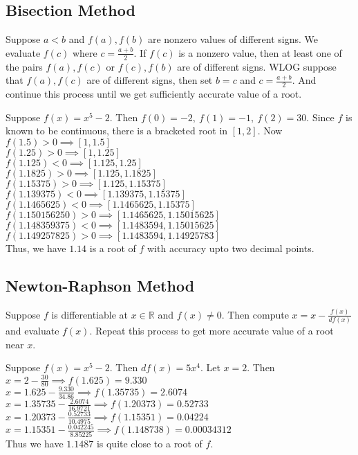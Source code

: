 \subsection{Bisection Method}
	Suppose $a < b$ and $f(a),f(b)$ are nonzero values of different signs. We evaluate $f(c)$ where $c = \frac{a+b}{2}$. If $f(c)$ is a nonzero value, then at least one of the pairs $f(a),f(c)$ or $f(c),f(b)$ are of different signs. WLOG suppose that $f(a),f(c)$ are of different signs, then set $b = c$ and $c = \frac{a+b}{2}$. And continue this process until we get sufficiently accurate value of a root.

\begin{remark}
	Suppose $f(x) = x^5 - 2$. Then $f(0) = -2,\ f(1) = -1,\ f(2) = 30$. Since $f$ is known to be continuous, there is a bracketed root in $[1,2]$. Now $f(1.5) > 0 \implies [1,1.5]$\\
	$f(1.25) > 0 \implies [1,1.25]$\\
	$f(1.125) < 0 \implies [1.125,1.25]$\\
	$f(1.1825)>0 \implies [1.125,1.1825]$\\
	$f(1.15375)>0 \implies [1.125,1.15375]$\\
	$f(1.139375) < 0 \implies [1.139375,1.15375]$\\
	$f(1.1465625) < 0 \implies [1.1465625,1.15375]$\\
	$f(1.150156250) > 0 \implies [1.1465625,1.15015625]$\\
	$f(1.148359375) < 0 \implies [1.1483594,1.15015625]$\\
	$f(1.149257825) > 0 \implies [1.1483594,1.14925783]$\\
	
	Thus, we have $1.14$ is a root of $f$ with accuracy upto two decimal points.
\end{remark}

\subsection{Newton-Raphson Method}
	Suppose $f$ is differentiable at $x \in \mathbb{R}$ and $f(x) \ne 0$. Then compute $x = x - \frac{f(x)}{df(x)}$ and evaluate $f(x)$. Repeat this process to get more accurate value of a root near $x$.

\begin{remark}
	Suppose $f(x) = x^5 - 2$. Then $df(x) = 5x^4$. Let $x = 2$. Then\\
	$x = 2 - \frac{30}{80} \implies f(1.625) = 9.330 $\\
	$x = 1.625 - \frac{9.330}{34.86} \implies f(1.35735) = 2.6074$ \\
	$x = 1.35735 - \frac{2.6074}{16.9721} \implies f(1.20373) = 0.52733$ \\
	$x = 1.20373 - \frac{0.52733}{10.4975} \implies f(1.15351) = 0.04224$ \\
	$x = 1.15351 - \frac{0.042245}{8.85225} \implies f(1.148738) = 0.00034312 $\\

	Thus we have $1.1487$ is quite close to a root of $f$.
\end{remark}

